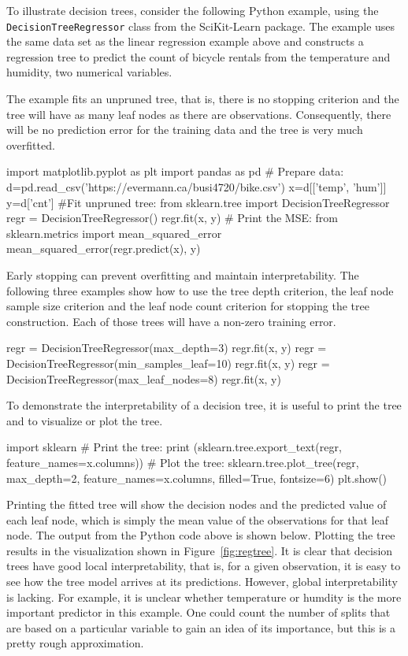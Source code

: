 \begin{withcode}
To illustrate decision trees, consider the following Python example, using the \\ \texttt{DecisionTreeRegressor} class from the SciKit-Learn package. The example uses the same data set as the linear regression example above and constructs a regression tree to predict the count of bicycle rentals from the temperature and humidity, two numerical variables. 

The example fits an unpruned tree, that is, there is no stopping criterion and the tree will have as many leaf nodes as there are observations. Consequently, there will be no prediction error for the training data and the tree is very much overfitted.

\begin{pythoncode}
import matplotlib.pyplot as plt
import pandas as pd
# Prepare data:
d=pd.read_csv('https://evermann.ca/busi4720/bike.csv')
x=d[['temp', 'hum']]
y=d['cnt']
#Fit unpruned tree:
from sklearn.tree import DecisionTreeRegressor
regr = DecisionTreeRegressor()
regr.fit(x, y)
# Print the MSE:
from sklearn.metrics import mean_squared_error
mean_squared_error(regr.predict(x), y)
\end{pythoncode}

Early stopping can prevent overfitting and maintain interpretability. The following three examples show how to use the tree depth criterion, the leaf node sample size criterion and the leaf node count criterion for stopping the tree construction. Each of those trees will have a non-zero training error.

\begin{pythoncode}
regr = DecisionTreeRegressor(max_depth=3)
regr.fit(x, y)
regr = DecisionTreeRegressor(min_samples_leaf=10)
regr.fit(x, y)
regr = DecisionTreeRegressor(max_leaf_nodes=8)
regr.fit(x, y)
\end{pythoncode}

To demonstrate the interpretability of a decision tree, it is useful to print the tree and to visualize or plot the tree. 

\begin{pythoncode}
import sklearn
# Print the tree:
print (sklearn.tree.export_text(regr, feature_names=x.columns))
# Plot the tree:
sklearn.tree.plot_tree(regr, max_depth=2, feature_names=x.columns, 
    filled=True, fontsize=6)
plt.show()
\end{pythoncode}

Printing the fitted tree will show the decision nodes and the predicted value of each leaf node, which is simply the mean value of the observations for that leaf node. The output from the Python code above is shown below. Plotting the tree results in the visualization shown in Figure~\ref{fig:regtree}. It is clear that decision trees have good local interpretability, that is, for a given observation, it is easy to see how the tree model arrives at its predictions. However, global interpretability is lacking. For example, it is unclear whether temperature or humdity is the more important predictor in this example. One could count the number of splits that are based on a particular variable to gain an idea of its importance, but this is a pretty rough approximation. 


\end{withcode}
